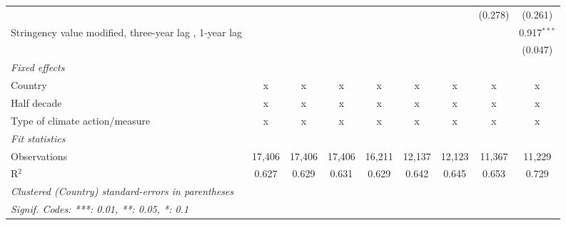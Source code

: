 \begin{table}[htbp]
\begin{tabular}{lcccccccc}
                                                                                                        &                &               &               &               &               &               & (0.278)       & (0.261)\\   
      Stringency value modified, three-year lag , 1-year lag                                            &                &               &               &               &               &               &               & 0.917$^{***}$\\   
                                                                                                        &                &               &               &               &               &               &               & (0.047)\\   
      \emph{Fixed effects}\\
      Country                                                                                           & x              & x             & x             & x             & x             & x             & x             & x\\  
      Half decade                                                                                       & x              & x             & x             & x             & x             & x             & x             & x\\  
      Type of climate action/measure                                                                    & x              & x             & x             & x             & x             & x             & x             & x\\  
      \midrule \emph{Fit statistics}\\
      Observations                                                                                      & 17,406         & 17,406        & 17,406        & 16,211        & 12,137        & 12,123        & 11,367        & 11,229\\  
      R$^2$                                                                                             & 0.627          & 0.629         & 0.631         & 0.629         & 0.642         & 0.645         & 0.653         & 0.729\\  
      \midrule
      \multicolumn{9}{l}{\emph{Clustered (Country) standard-errors in parentheses}}\\
      \multicolumn{9}{l}{\emph{Signif. Codes: ***: 0.01, **: 0.05, *: 0.1}}\\
   \end{tabular}
\end{table}


